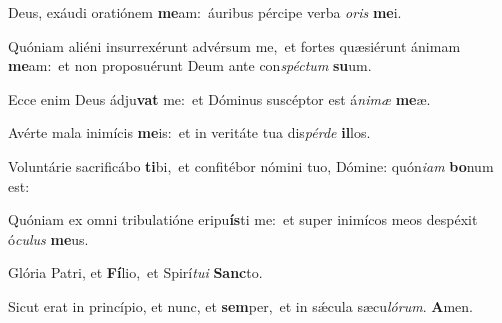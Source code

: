 \vs Deus, exáudi oratiónem \textbf{me}am:~\redgreheightstar áuribus pércipe verba \textit{o}\textit{ris} \textbf{me}i.

\vs Quóniam aliéni insurrexérunt advérsum me,~\reddagger et fortes quæsiérunt ánimam \textbf{me}am:~\redgreheightstar et non proposuérunt Deum ante con\textit{spéc}\textit{tum} \textbf{su}um.

\vs Ecce enim Deus ádju\textbf{vat} me:~\redgreheightstar et Dóminus suscéptor est á\textit{ni}\textit{mæ} \textbf{me}æ.

\vs Avérte mala inimícis \textbf{me}is:~\redgreheightstar et in veritáte tua dis\textit{pér}\textit{de} \textbf{il}los.

\vs Voluntárie sacrificábo \textbf{ti}bi,~\redgreheightstar et confitébor nómini tuo, Dómine: quón\textit{i}\textit{am} \textbf{bo}num est:

\vs Quóniam ex omni tribulatióne eripu\textbf{ís}ti me:~\redgreheightstar et super inimícos meos despéxit ó\textit{cu}\textit{lus} \textbf{me}us.

\vs Glória Patri, et \textbf{Fí}lio,~\redgreheightstar et Spirí\textit{tu}\textit{i} \textbf{Sanc}to.

\vs Sicut erat in princípio, et nunc, et \textbf{sem}per,~\redgreheightstar et in sǽcula sæcu\textit{ló}\textit{rum}. \textbf{A}men.


